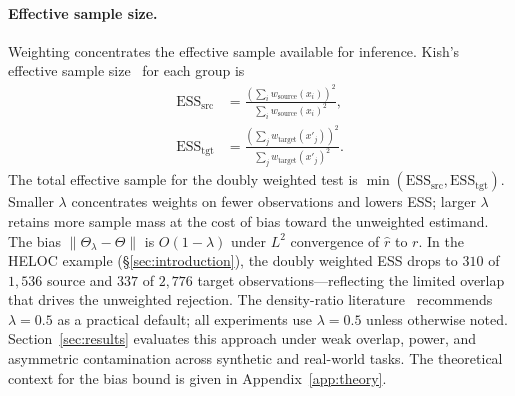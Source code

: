 \paragraph{Effective sample size.}
Weighting concentrates the effective sample available for inference. Kish's effective sample size~\cite{Kish_1965} for each group is
\begin{align}
\mathrm{ESS}_{\mathrm{src}} &= \frac{(\sum_i w_{\mathrm{source}}(x_i))^2}{\sum_i w_{\mathrm{source}}(x_i)^2},\\
\mathrm{ESS}_{\mathrm{tgt}} &= \frac{(\sum_j w_{\mathrm{target}}(x'_j))^2}{\sum_j w_{\mathrm{target}}(x'_j)^2}.
\end{align}
The total effective sample for the doubly weighted test is $\min(\mathrm{ESS}_{\mathrm{src}}, \mathrm{ESS}_{\mathrm{tgt}})$. Smaller $\lambda$ concentrates weights on fewer observations and lowers ESS; larger $\lambda$ retains more sample mass at the cost of bias toward the unweighted estimand. The bias $\|\Theta_\lambda - \Theta\|$ is $O(1-\lambda)$ under $L^2$ convergence of $\hat{r}$ to $r$. In the HELOC example (\S\ref{sec:introduction}), the doubly weighted ESS drops to $310$ of $1{,}536$ source and $337$ of $2{,}776$ target observations---reflecting the limited overlap that drives the unweighted rejection. The density-ratio literature~\cite{Yamada_2013} recommends $\lambda=0.5$ as a practical default; all experiments use $\lambda=0.5$ unless otherwise noted. Section~\ref{sec:results} evaluates this approach under weak overlap, power, and asymmetric contamination across synthetic and real-world tasks. The theoretical context for the bias bound is given in Appendix~\ref{app:theory}.
